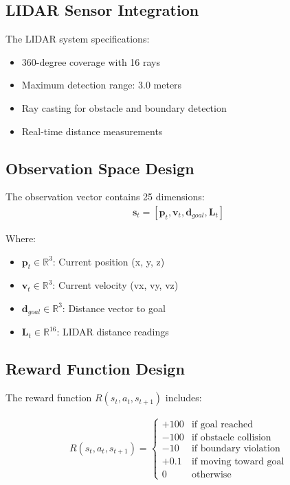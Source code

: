 \documentclass[12pt,a4paper]{article}
\begin{document}
\subsection{LIDAR Sensor Integration}
The LIDAR system specifications:
\begin{itemize}
    \item 360-degree coverage with 16 rays
    \item Maximum detection range: 3.0 meters
    \item Ray casting for obstacle and boundary detection
    \item Real-time distance measurements
\end{itemize}

\subsection{Observation Space Design}
The observation vector contains 25 dimensions:
\begin{align}
\mathbf{s}_t = [\mathbf{p}_t, \mathbf{v}_t, \mathbf{d}_{goal}, \mathbf{L}_t]
\end{align}

Where:
\begin{itemize}
    \item $\mathbf{p}_t \in \mathbb{R}^3$: Current position (x, y, z)
    \item $\mathbf{v}_t \in \mathbb{R}^3$: Current velocity (vx, vy, vz)
    \item $\mathbf{d}_{goal} \in \mathbb{R}^3$: Distance vector to goal
    \item $\mathbf{L}_t \in \mathbb{R}^{16}$: LIDAR distance readings
\end{itemize}

\subsection{Reward Function Design}
The reward function $R(s_t, a_t, s_{t+1})$ includes:

\begin{align}
R(s_t, a_t, s_{t+1}) = \begin{cases}
+100 & \text{if goal reached} \\
-100 & \text{if obstacle collision} \\
-10 & \text{if boundary violation} \\
+0.1 & \text{if moving toward goal} \\
0 & \text{otherwise}
\end{cases}
\end{align}
\end{document}
